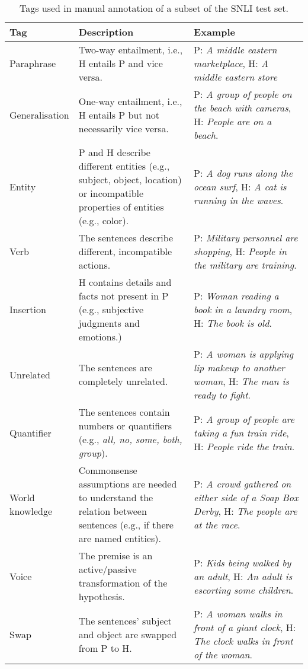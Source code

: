 \documentclass[11pt]{article}
\begin{document}
\begin{table}
	\small
    \centering
    \begin{tabular}{p{0.2\linewidth}p{0.4\linewidth}p{0.4\linewidth}}
    \hline
        Tag & Description & Example \\\hline
        Paraphrase & Two-way entailment, i.e., H entails P and vice versa. & P: \emph{A middle eastern marketplace}, H: \emph{A middle eastern store}\\
        Generalisation & One-way entailment, i.e., H entails P but not necessarily vice versa. & P: \emph{A group of people on the beach with cameras}, H: \emph{People are on a beach}.\\
        Entity & P and H describe different entities (e.g., subject, object, location) or incompatible properties of entities (e.g., color). & P: \emph{A dog runs along the ocean surf}, H: \emph{A cat is running in the waves}. \\
        Verb & The sentences describe different, incompatible actions. & P: \emph{Military personnel are shopping}, H: \emph{People in the military are training}. \\
        Insertion & H contains details and facts not present in P (e.g., subjective judgments and emotions.) & P: \emph{Woman reading a book in a laundry room}, H: \emph{The book is old}.\\
        Unrelated & The sentences are completely unrelated. & P: \emph{A woman is applying lip makeup to another woman}, H: \emph{The man is ready to fight}.\\
        Quantifier & The sentences contain numbers or quantifiers (e.g., \emph{all, no, some, both, group}). & P: \emph{A group of people are taking a fun train ride}, H: \emph{People ride the train}.\\
        World knowledge & Commonsense assumptions are needed to understand the relation between sentences (e.g., if there are named entities). & P: \emph{A crowd gathered on either side of a Soap Box Derby}, H: \emph{The people are at the race}.\\
        Voice & The premise is an active/passive transformation of the hypothesis. & P: \emph{Kids being walked by an adult}, H: \emph{An adult is escorting some children}.\\
        Swap & The sentences' subject and object are swapped from P to H. & P: \emph{A woman walks in front of a giant clock}, H: \emph{The clock walks in front of the woman}.\\\hline
    \end{tabular}
    \caption{Tags used in manual annotation of a subset of the SNLI test set.}\label{tab:manualtags}
\end{table}
\end{document}
